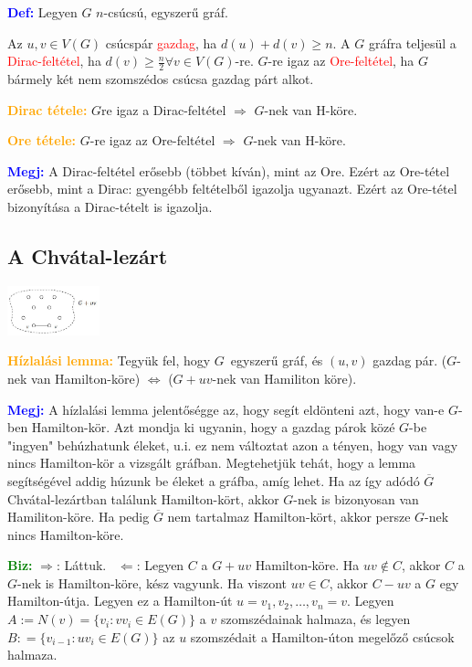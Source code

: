 \documentclass[../szamtud.tex]{subfiles}
\begin{document}
        \textcolor{blue}{\textbf{Def:}} Legyen $G$ $n$-csúcsú, egyszerű gráf.

        Az $u,v \in V(G)$ csúcspár \textcolor{red}{gazdag}, ha $d(u) + d(v) \geq n$. A $G$ gráfra teljesül a \textcolor{red}{Dirac-feltétel}, ha $d(v) \geq \frac{n}{2} \forall v \in V(G)$-re. $G$-re igaz az \textcolor{red}{Ore-feltétel}, ha $G$ bármely két nem szomszédos csúcsa gazdag párt alkot.

        \textcolor{orange}{\textbf{Dirac tétele:}} $G$re igaz a Dirac-feltétel $\Rightarrow$ $G$-nek van H-köre.

        \textcolor{orange}{\textbf{Ore tétele:}} $G$-re igaz az Ore-feltétel $\Rightarrow$ $G$-nek van H-köre.

        \textcolor{blue}{\textbf{Megj:}} A Dirac-feltétel erősebb (többet kíván), mint az Ore. Ezért az Ore-tétel erősebb, mint a Dirac: gyengébb feltételből igazolja ugyanazt. Ezért az Ore-tétel bizonyítása a Dirac-tételt is igazolja.

   \subsection{A Chvátal-lezárt} 

        \includegraphics[width=0.2\textwidth]{./img/7.png}

        \textcolor{orange}{\textbf{Hízlalási lemma:}} Tegyük fel, hogy $G$ egyszerű gráf, és $(u,v)$ gazdag pár. ($G$-nek van Hamilton-köre) $\Longleftrightarrow$ ($G + uv$-nek van Hamiliton köre).

        \textcolor{blue}{\textbf{Megj:}} A hízlalási lemma jelentőségge az, hogy segít eldönteni azt, hogy van-e $G$-ben Hamilton-kör. Azt mondja ki ugyanin, hogy a gazdag párok közé $G$-be "ingyen" behúzhatunk éleket, u.i. ez nem változtat azon a tényen, hogy van vagy nincs Hamilton-kör a vizsgált gráfban. Megtehetjük tehát, hogy a lemma segítségével addig húzunk be éleket a gráfba, amíg lehet. Ha az így adódó $\overline{G}$ Chvátal-lezártban találunk Hamilton-kört, akkor $G$-nek is bizonyosan van Hamiliton-köre. Ha pedig $\overline{G}$ nem tartalmaz Hamilton-kört, akkor persze $G$-nek nincs Hamilton-köre.

        \textcolor{green}{\textbf{Biz:}} $\Rightarrow$: Láttuk. \checkmark $\Leftarrow$: Legyen $C$ a $G + uv$ Hamilton-köre. Ha $uv \notin C$, akkor $C$ a $G$-nek is Hamilton-köre, kész vagyunk. Ha viszont $uv \in C$, akkor $C-uv$ a $G$ egy Hamilton-útja. Legyen ez a Hamilton-út $u = v_1, v_2, \dots, v_n = v$. Legyen $A:=N(v) = \{v_i:vv_i \in E(G)\}$ a $v$ szomszédainak halmaza, és legyen $B: = \{v_{i-1} : uv_i \in E(G)\}$ az $u$ szomszédait a Hamilton-úton megelőző csúcsok halmaza.
\end{document}
